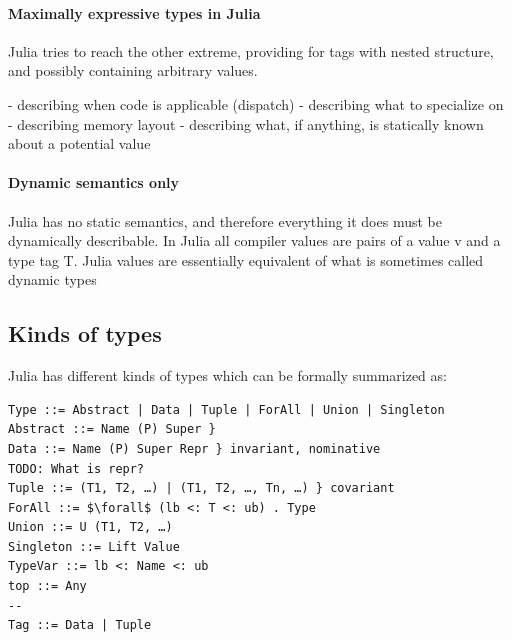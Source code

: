 \documentclass[pldi]{sigplanconf-pldi15}
\begin{document}
\paragraph{Maximally expressive types in Julia}
Julia tries to reach the other extreme, providing for tags with nested structure, and
possibly containing arbitrary values.

- describing when code is applicable (dispatch)
- describing what to specialize on
- describing memory layout
- describing what, if anything, is statically known about a potential value

\paragraph{Dynamic semantics only}
Julia has no static semantics, and therefore everything it does must be
dynamically describable.
In Julia all compiler values are pairs of a value v and a type tag T. Julia
values are essentially equivalent of what is sometimes called dynamic
types~\cite[Section 11.10, p. 142]{Pierce2002}


\subsection{Kinds of types}

Julia has different kinds of types which can be formally summarized as:

\begin{verbatim}
Type ::= Abstract | Data | Tuple | ForAll | Union | Singleton
Abstract ::= Name (P) Super }
Data ::= Name (P) Super Repr } invariant, nominative
TODO: What is repr?
Tuple ::= (T1, T2, …) | (T1, T2, …, Tn, …) } covariant
ForAll ::= $\forall$ (lb <: T <: ub) . Type
Union ::= U (T1, T2, …)
Singleton ::= Lift Value
TypeVar ::= lb <: Name <: ub
top ::= Any
--
Tag ::= Data | Tuple
\end{verbatim}
\end{document}
